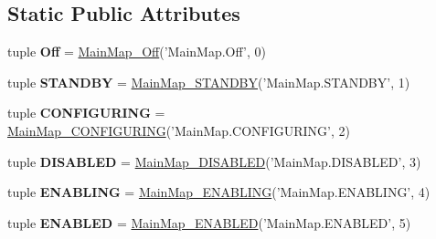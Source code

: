 \subsection*{Static Public Attributes}
\begin{DoxyCompactItemize}
\item 
\hypertarget{classlifecycle__sm_1_1_main_map_abbd3fd9b9314f565a3c56231c78d06be}{tuple {\bfseries Off} = \hyperlink{classlifecycle__sm_1_1_main_map___off}{Main\-Map\-\_\-\-Off}('Main\-Map.\-Off', 0)}\label{classlifecycle__sm_1_1_main_map_abbd3fd9b9314f565a3c56231c78d06be}

\item 
\hypertarget{classlifecycle__sm_1_1_main_map_aeb3b18cd5552dd70c10e6cf835d730a7}{tuple {\bfseries S\-T\-A\-N\-D\-B\-Y} = \hyperlink{classlifecycle__sm_1_1_main_map___s_t_a_n_d_b_y}{Main\-Map\-\_\-\-S\-T\-A\-N\-D\-B\-Y}('Main\-Map.\-S\-T\-A\-N\-D\-B\-Y', 1)}\label{classlifecycle__sm_1_1_main_map_aeb3b18cd5552dd70c10e6cf835d730a7}

\item 
\hypertarget{classlifecycle__sm_1_1_main_map_a209a2c58d27c92fc8676b7d8b7b0166e}{tuple {\bfseries C\-O\-N\-F\-I\-G\-U\-R\-I\-N\-G} = \hyperlink{classlifecycle__sm_1_1_main_map___c_o_n_f_i_g_u_r_i_n_g}{Main\-Map\-\_\-\-C\-O\-N\-F\-I\-G\-U\-R\-I\-N\-G}('Main\-Map.\-C\-O\-N\-F\-I\-G\-U\-R\-I\-N\-G', 2)}\label{classlifecycle__sm_1_1_main_map_a209a2c58d27c92fc8676b7d8b7b0166e}

\item 
\hypertarget{classlifecycle__sm_1_1_main_map_abf49e9e3250da984ae952cca0924f18e}{tuple {\bfseries D\-I\-S\-A\-B\-L\-E\-D} = \hyperlink{classlifecycle__sm_1_1_main_map___d_i_s_a_b_l_e_d}{Main\-Map\-\_\-\-D\-I\-S\-A\-B\-L\-E\-D}('Main\-Map.\-D\-I\-S\-A\-B\-L\-E\-D', 3)}\label{classlifecycle__sm_1_1_main_map_abf49e9e3250da984ae952cca0924f18e}

\item 
\hypertarget{classlifecycle__sm_1_1_main_map_a08bf3bf2fe1935ef4401b0e41fa5c138}{tuple {\bfseries E\-N\-A\-B\-L\-I\-N\-G} = \hyperlink{classlifecycle__sm_1_1_main_map___e_n_a_b_l_i_n_g}{Main\-Map\-\_\-\-E\-N\-A\-B\-L\-I\-N\-G}('Main\-Map.\-E\-N\-A\-B\-L\-I\-N\-G', 4)}\label{classlifecycle__sm_1_1_main_map_a08bf3bf2fe1935ef4401b0e41fa5c138}

\item 
\hypertarget{classlifecycle__sm_1_1_main_map_a3e249b890a317296951e032c02faa547}{tuple {\bfseries E\-N\-A\-B\-L\-E\-D} = \hyperlink{classlifecycle__sm_1_1_main_map___e_n_a_b_l_e_d}{Main\-Map\-\_\-\-E\-N\-A\-B\-L\-E\-D}('Main\-Map.\-E\-N\-A\-B\-L\-E\-D', 5)}\label{classlifecycle__sm_1_1_main_map_a3e249b890a317296951e032c02faa547}


\end{DoxyCompactItemize}
